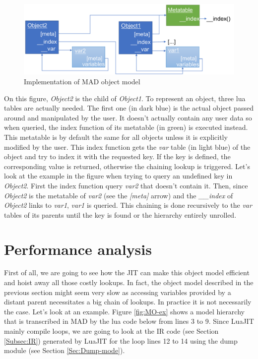 \begin{figure}[H]
    \centering
    \includegraphics[width=\textwidth]{./Images/MO.pdf}
    \caption{Implementation of MAD object model}
    \label{fig:MO-descriptinon}
\end{figure}

On this figure, \emph{Object2} is the child of \emph{Object1}. To represent an
object, three lua tables are actually needed. The first one (in dark blue) is
the actual object passed around and manipulated by the user. It doesn't actually
contain any user data so when queried, the index function of its metatable (in
green) is executed instead. This metatable is by default the same for all objects
unless it is explicitly modified by the user. This index function gets the
\emph{var} table (in light blue) of the object and try to index it with the
requested key. If the key is defined, the corresponding value is returned,
otherwise the chaining lookup is triggered. Let's look at the example in the
figure when trying to query an undefined key in \emph{Object2}.
First the index function query \emph{var2} that doesn't contain it. Then, since
\emph{Object2} is the metatable of \emph{var2} (see the \emph{[meta]} arrow) and
the \emph{\_\_index} of \emph{Object2} links to \emph{var1}, \emph{var1} is queried.
This chaining is done recursively to the \emph{var} tables of its parents until the
key is found or the hierarchy entirely unrolled.


\section{Performance analysis}
\label{Sec:MO-perf-analys}

First of all, we are going to see how the JIT can make this object model
efficient and hoist away  all those costly lookups. In fact, the object model
described in the previous section might seem very slow as accessing variables
provided by a distant parent necessitates a big chain of lookups. In practice it
is not necessarily the case. Let's look at an example. Figure \ref{fig:MO-ex}
shows a model hierarchy that is transcribed in MAD by the lua code below from
lines 3 to 9. Since LuaJIT mainly compile loops, we are going to look at the IR
code (see Section \ref{Subsec:IR}) generated by LuaJIT for the loop lines 12 to 14
using the dump module (see Section \ref{Sec:Dump-mode}).


